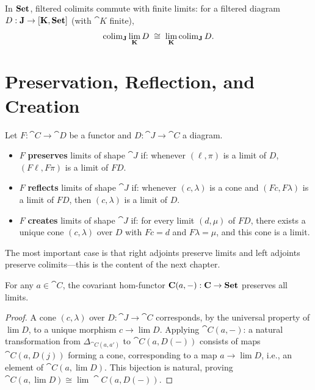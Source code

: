 \begin{theorem}
In $\mathbf{Set}$, filtered colimits commute with finite limits: for a filtered diagram $D: \mathbf{J} \to [\mathbf{K}, \mathbf{Set}]$ (with $\cat{K}$ finite),
\[
  \operatorname{colim}_{\mathbf{J}} \lim_{\mathbf{K}} D \;\cong\; \lim_{\mathbf{K}} \operatorname{colim}_{\mathbf{J}} D.
\]
\end{theorem}

\section{Preservation, Reflection, and Creation}

\begin{definition}
Let $F: \cat{C} \to \cat{D}$ be a functor and $D: \cat{J} \to \cat{C}$ a diagram.
\begin{itemize}
  \item $F$ \textbf{preserves} limits of shape $\cat{J}$ if: whenever $(\ell, \pi)$ is a limit of $D$, $(F\ell, F\pi)$ is a limit of $FD$.
  \item $F$ \textbf{reflects} limits of shape $\cat{J}$ if: whenever $(c, \lambda)$ is a cone and $(Fc, F\lambda)$ is a limit of $FD$, then $(c, \lambda)$ is a limit of $D$.
  \item $F$ \textbf{creates} limits of shape $\cat{J}$ if: for every limit $(d, \mu)$ of $FD$, there exists a unique cone $(c, \lambda)$ over $D$ with $Fc = d$ and $F\lambda = \mu$, and this cone is a limit.
\end{itemize}
\end{definition}

The most important case is that right adjoints preserve limits and left adjoints preserve colimits—this is the content of the next chapter.

\begin{theorem}
For any $a \in \cat{C}$, the covariant hom-functor $\mathbf{C}(a,-): \mathbf{C} \to \mathbf{Set}$ preserves all limits.
\end{theorem}

\begin{proof}
A cone $(c, \lambda)$ over $D: \cat{J} \to \cat{C}$ corresponds, by the universal property of $\lim D$, to a unique morphism $c \to \lim D$. Applying $\cat{C}(a,-)$: a natural transformation from $\Delta_{\cat{C}(a,a')}$ to $\cat{C}(a, D(-))$ consists of maps $\cat{C}(a, D(j))$ forming a cone, corresponding to a map $a \to \lim D$, i.e., an element of $\cat{C}(a, \lim D)$. This bijection is natural, proving $\cat{C}(a, \lim D) \cong \lim \cat{C}(a, D(-))$.
\end{proof}

